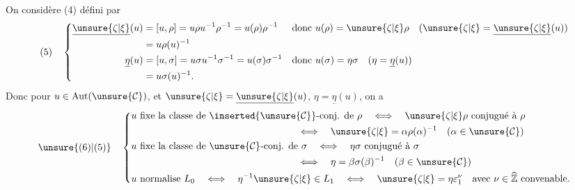 On  considère
\hfill(4)
défini par
\[
(5)\quad
\left\{\begin{aligned}
\underline{\unsure{\zeta|\xi}}(u)&=[u,\rho]=u\rho u^{-1}\rho^{-1}=u(\rho)\rho^{-1}
&&\text{donc }u(\rho)=\unsure{\zeta|\xi}\rho\quad(\unsure{\zeta|\xi}=\underline{\unsure{\zeta|\xi}}(u))\\
&=u\rho(u)^{-1}\\
\underline{\eta}(u)&=[u,\sigma]=u\sigma u^{-1}\sigma^{-1}=u(\sigma)\sigma^{-1}
&&\text{donc }u(\sigma)=\eta\sigma\quad(\eta=\underline{\eta}(u))\\
&=u\sigma(u)^{-1}.
\end{aligned}\right.
\]
Donc pour $u\in\mathrm{Aut}(\unsure{\mathcal{C}})$, et $\unsure{\zeta|\xi}=\underline{\unsure{\zeta|\xi}}(u)$, $\eta=\underline{\eta}(u)$, on a
\[
\unsure{(6)|(5)}\quad
\left\{\begin{aligned}
&u\text{ fixe la classe de }\inserted{\unsure{\mathcal{C}}}\text{-conj. de }\rho
\quad\Longleftrightarrow\quad \unsure{\zeta|\xi}\rho\text{ conjugué à }\rho\\
&\hspace{6cm}\Longleftrightarrow\quad\unsure{\zeta|\xi}=\alpha\rho(\alpha)^{-1}\quad(\alpha\in\unsure{\mathcal{C}})\\
&u\text{ fixe la classe de }\unsure{\mathcal{C}}\text{-conj. de }\sigma
\quad\Longleftrightarrow\quad \eta\sigma\text{ conjugué à }\sigma\\
&\hspace{6cm}\Longleftrightarrow\quad\eta=\beta\sigma(\beta)^{-1}\quad(\beta\in\unsure{\mathcal{C}})\\
&u\text{ normalise }L_0\quad\Longleftrightarrow\quad\eta^{-1}\unsure{\zeta|\xi}\in L_1
\quad\Longleftrightarrow\quad\unsure{\zeta|\xi}=\eta\varepsilon_1^\nu\quad\text{avec }\nu\in\widehat{\mathbb Z}\text{ convenable}.
\end{aligned}\right.
\]

